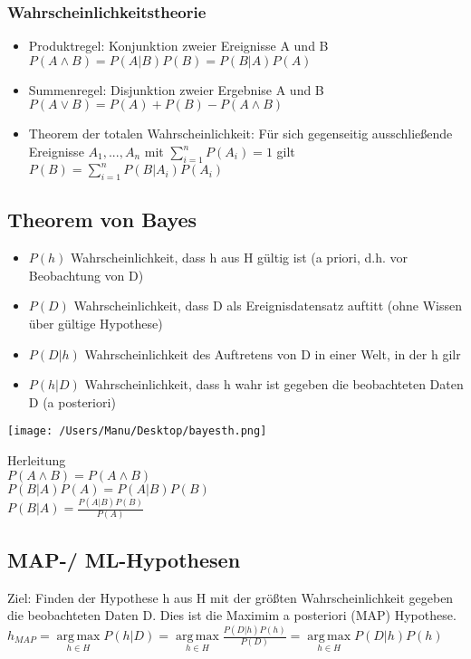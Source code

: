 \documentclass[paper=a4, fontsize=11pt]{scrartcl} %
\numberwithin{equation}{section} %
\numberwithin{figure}{section} %
\numberwithin{table}{section} %
\DeclareMathOperator*{\argmax}{arg\,max}
\begin{document}
\subsubsection{Wahrscheinlichkeitstheorie}

\begin{itemize}
\item Produktregel: Konjunktion zweier Ereignisse A und B $P(A \land B) = P(A|B) P(B) = P(B|A) P(A)$
\item Summenregel: Disjunktion zweier Ergebnise A und B $P(A \lor B) = P(A) + P(B) - P(A \land B)$
\item Theorem der totalen Wahrscheinlichkeit: Für sich gegenseitig ausschließende Ereignisse $A_1,...,A_n$ mit $\sum\limits_{i=1}^n P(A_i) = 1$ gilt $P(B) = \sum\limits_{i=1}^n P(B|A_i)P(A_i)$
\end{itemize}

\subsection{Theorem von Bayes}

\begin{itemize}
\item $P(h)$ Wahrscheinlichkeit, dass h aus H gültig ist (a priori, d.h. vor Beobachtung von D)
\item $P(D)$ Wahrscheinlichkeit, dass D als Ereignisdatensatz auftitt (ohne Wissen über gültige Hypothese)
\item $P(D|h)$ Wahrscheinlichkeit des Auftretens von D in einer Welt, in der h gilr
\item $P(h|D)$ Wahrscheinlichkeit, dass h wahr ist gegeben die beobachteten Daten D (a posteriori)
\end{itemize}

\texttt{[image: /Users/Manu/Desktop/bayesth.png]}

Herleitung\\ 
$P(A \land B) = P(A \land B)$\\ 
$P(B|A) P(A) = P(A|B) P(B)$\\ 
$P(B|A) = \frac{P(A|B)P(B)}{P(A)}$

\subsection{MAP-/ ML-Hypothesen}

Ziel: Finden der Hypothese h aus H mit der größten Wahrscheinlichkeit gegeben die beobachteten Daten D. Dies ist die Maximim a posteriori (MAP) Hypothese.\\ 
$ h_{MAP} = \argmax\limits_{h \in H} P(h|D) = \argmax\limits_{h \in H} \frac{P(D|h)P(h)}{P(D)} = \argmax\limits_{h \in H} P(D|h)P(h)$
\end{document}
